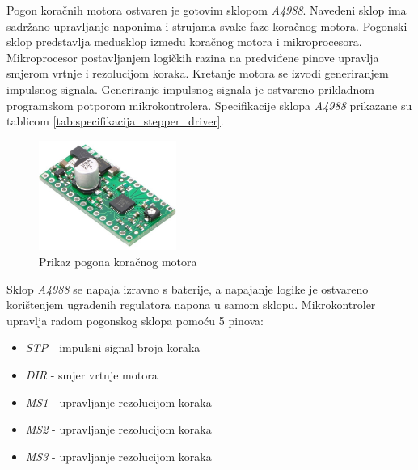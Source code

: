 \documentclass[11pt,a4paper]{article}
\begin{document}
Pogon koračnih motora ostvaren je gotovim sklopom \textit{A4988}. Navedeni sklop ima sadržano upravljanje naponima i strujama svake faze koračnog motora. Pogonski sklop predstavlja međusklop između koračnog motora i mikroprocesora. Mikroprocesor postavljanjem logičkih razina na predviđene pinove upravlja smjerom vrtnje i rezolucijom koraka. Kretanje motora se izvodi generiranjem impulsnog signala. Generiranje impulsnog signala je ostvareno prikladnom programskom potporom mikrokontrolera. Specifikacije sklopa \textit{A4988} prikazane su tablicom \ref{tab:specifikacija_stepper_driver}.


\begin{figure}[H]
	\centering
	\includegraphics[width=0.4\textwidth]{figures/driver.jpg}
	\caption{Prikaz pogona koračnog motora}
	\label{Slika:stepper_driver}
\end{figure}

Sklop \textit{A4988} se napaja izravno s baterije, a napajanje logike je ostvareno korištenjem ugrađenih regulatora napona u samom sklopu. Mikrokontroler upravlja radom pogonskog sklopa pomoću 5 pinova:
\begin{center}
	\begin{itemize}
		\item \textit{STP} - impulsni signal broja koraka
		\item \textit{DIR} - smjer vrtnje motora
		\item \textit{MS1} - upravljanje rezolucijom koraka
		\item \textit{MS2} - upravljanje rezolucijom koraka
		\item \textit{MS3} - upravljanje rezolucijom koraka
	\end{itemize}
\end{center}
\end{document}
